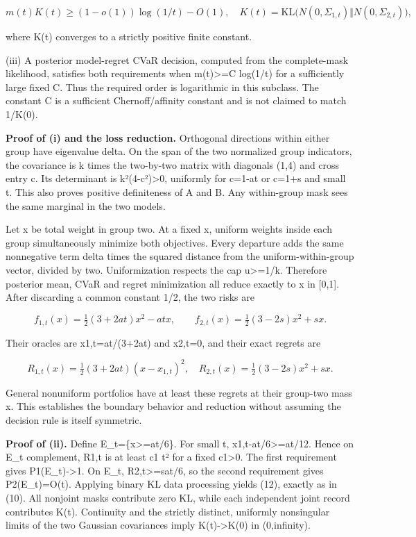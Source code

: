 \documentclass[10pt]{article}
\begin{document}
\begin{equation}
m(t)K(t)\ge(1-o(1))\log(1/t)-O(1),\quad
K(t)=\mathrm{KL}\bigl(N(0,\Sigma_{1,t})\Vert N(0,\Sigma_{2,t})\bigr),\tag{12}
\end{equation}



where K(t) converges to a strictly positive finite constant.

(iii) A posterior model-regret CVaR decision, computed from the complete-mask likelihood, satisfies both requirements when m(t)>=C log(1/t) for a sufficiently large fixed C. Thus the required order is logarithmic in this subclass. The constant C is a sufficient Chernoff/affinity constant and is not claimed to match 1/K(0).

\textbf{Proof of (i) and the loss reduction.} Orthogonal directions within either group have eigenvalue delta. On the span of the two normalized group indicators, the covariance is k times the two-by-two matrix with diagonals (1,4) and cross entry c. Its determinant is k²(4-c²)>0, uniformly for c=1-at or c=1+s and small t. This also proves positive definiteness of A and B. Any within-group mask sees the same marginal in the two models.

Let x be total weight in group two. At a fixed x, uniform weights inside each group simultaneously minimize both objectives. Every departure adds the same nonnegative term delta times the squared distance from the uniform-within-group vector, divided by two. Uniformization respects the cap u>=1/k. Therefore posterior mean, CVaR and regret minimization all reduce exactly to x in [0,1]. After discarding a common constant 1/2, the two risks are

\[
f_{1,t}(x)=\tfrac12(3+2at)x^2-atx,\qquad
f_{2,t}(x)=\tfrac12(3-2s)x^2+sx.
\]



Their oracles are x1,t=at/(3+2at) and x2,t=0, and their exact regrets are

\begin{equation}
R_{1,t}(x)=\tfrac12(3+2at)(x-x_{1,t})^2,\quad
R_{2,t}(x)=\tfrac12(3-2s)x^2+sx.\tag{13}
\end{equation}



General nonuniform portfolios have at least these regrets at their group-two mass x. This establishes the boundary behavior and reduction without assuming the decision rule is itself symmetric.

\textbf{Proof of (ii).} Define E\_t=\{x>=at/6\}. For small t, x1,t-at/6>=at/12. Hence on E\_t complement, R1,t is at least c1 t² for a fixed c1>0. The first requirement gives P1(E\_t)->1. On E\_t, R2,t>=sat/6, so the second requirement gives P2(E\_t)=O(t). Applying binary KL data processing yields (12), exactly as in (10). All nonjoint masks contribute zero KL, while each independent joint record contributes K(t). Continuity and the strictly distinct, uniformly nonsingular limits of the two Gaussian covariances imply K(t)->K(0) in (0,infinity).
\end{document}
